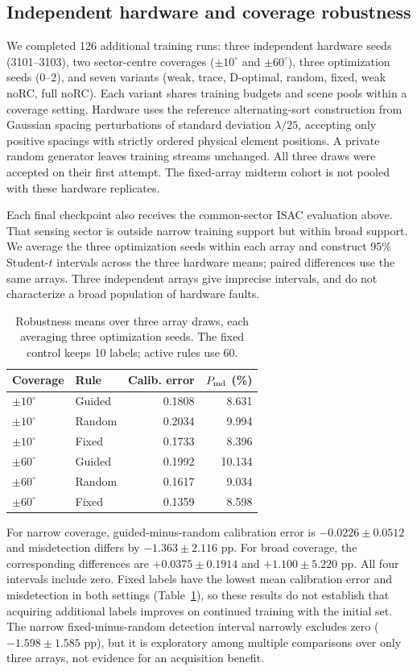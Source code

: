 \documentclass[conference]{IEEEtran}
\begin{document}
\subsection{Independent hardware and coverage robustness}
We completed 126 additional training runs: three independent hardware seeds (3101--3103), two sector-centre coverages ($\pm10^\circ$ and $\pm60^\circ$), three optimization seeds (0--2), and seven variants (weak, trace, D-optimal, random, fixed, weak noRC, full noRC). Each variant shares training budgets and scene pools within a coverage setting. Hardware uses the reference alternating-sort construction from Gaussian spacing perturbations of standard deviation $\lambda/25$, accepting only positive spacings with strictly ordered physical element positions. A private random generator leaves training streams unchanged. All three draws were accepted on their first attempt. The fixed-array midterm cohort is not pooled with these hardware replicates.

Each final checkpoint also receives the common-sector ISAC evaluation above. That sensing sector is outside narrow training support but within broad support. We average the three optimization seeds within each array and construct 95\% Student-$t$ intervals across the three hardware means; paired differences use the same arrays. Three independent arrays give imprecise intervals, and do not characterize a broad population of hardware faults.

\begin{table}[t]\centering\small
\caption{Robustness means over three array draws, each averaging three optimization seeds. The fixed control keeps 10 labels; active rules use 60.}\label{tab:hardware}
\begin{tabular}{llrr}\toprule
Coverage & Rule & Calib. error & $P_{\rm md}$ (\%)\\\midrule
$\pm10^\circ$ & Guided & 0.1808 & 8.631 \\
$\pm10^\circ$ & Random & 0.2034 & 9.994 \\
$\pm10^\circ$ & Fixed & 0.1733 & 8.396 \\
$\pm60^\circ$ & Guided & 0.1992 & 10.134 \\
$\pm60^\circ$ & Random & 0.1617 & 9.034 \\
$\pm60^\circ$ & Fixed & 0.1359 & 8.598 \\
\bottomrule\end{tabular}\end{table}

For narrow coverage, guided-minus-random calibration error is $-0.0226\pm0.0512$ and misdetection differs by $-1.363\pm2.116$ pp. For broad coverage, the corresponding differences are $+0.0375\pm0.1914$ and $+1.100\pm5.220$ pp. All four intervals include zero. Fixed labels have the lowest mean calibration error and misdetection in both settings (Table~\ref{tab:hardware}), so these results do not establish that acquiring additional labels improves on continued training with the initial set. The narrow fixed-minus-random detection interval narrowly excludes zero ($-1.598\pm1.585$ pp), but it is exploratory among multiple comparisons over only three arrays, not evidence for an acquisition benefit.
\end{document}
